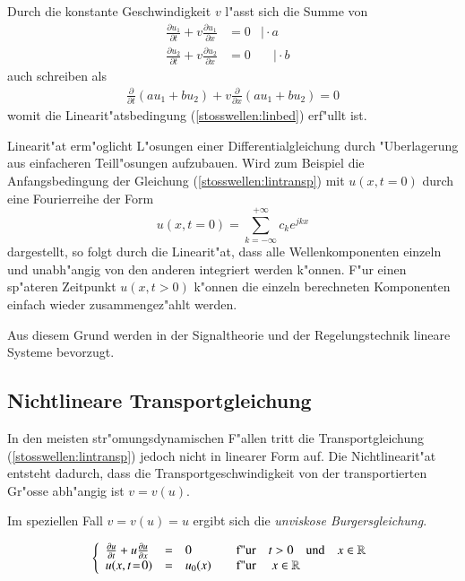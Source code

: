 \begin{refsection}
Durch die konstante Geschwindigkeit $v$ l"asst sich die Summe von
\begin{align*}
\frac{\partial u_{1}}{\partial t} + v\frac{\partial u_{1}}{\partial x}&= 0 &\bigg| \cdot a& \\
\frac{\partial u_{2}}{\partial t} + v\frac{\partial u_{2}}{\partial x}&= 0 &\quad \bigg| \cdot b&
\end{align*}
auch schreiben als
\begin{align*}
	\frac{\partial}{\partial t}(au_{1} + bu_{2}) + v\frac{\partial }{\partial x}(au_{1} + bu_{2}) = 0
\end{align*}
womit die Linearit"atsbedingung (\ref{stosswellen:linbed}) erf"ullt ist.

Linearit"at erm"oglicht L"osungen einer Differentialgleichung durch
"Uberlagerung aus einfacheren Teill"osungen aufzubauen. Wird zum Beispiel
die Anfangsbedingung der Gleichung (\ref{stosswellen:lintransp}) mit
$u(x,t\!=\!0)$ durch eine Fourierreihe der Form
\begin{equation}
	u(x,t\!=\!0) = \sum_{k=-\infty}^{+\infty} c_{k} e^{jkx}
\end{equation}
dargestellt, so folgt durch die Linearit"at, dass alle Wellenkomponenten
einzeln und unabh"angig von den anderen integriert werden k"onnen. F"ur
einen sp"ateren Zeitpunkt $u(x,t\!>\!0)$ k"onnen die einzeln berechneten
Komponenten einfach wieder zusammengez"ahlt werden.

Aus diesem Grund werden in der Signaltheorie und der Regelungstechnik
lineare Systeme bevorzugt.

\subsection{Nichtlineare Transportgleichung}

In den meisten str"omungsdynamischen F"allen tritt die Transportgleichung
(\ref{stosswellen:lintransp}) jedoch nicht in linearer Form auf. Die
Nichtlinearit"at entsteht dadurch, dass die Transportgeschwindigkeit
von der transportierten Gr"osse abh"angig ist $v=v(u)$. 

Im speziellen Fall $v\!=\!v(u)\!=\!u$ ergibt sich die \textit{unviskose
Burgersgleichung}\cite{stoss:burgersgleichung}. 

\begin{equation}
	\left\{
	\begin{array}{lcl}
	\frac{\partial u}{\partial t} + u\frac{\partial u}{\partial x} &=& 0 \hspace{1.25cm} \text{f"ur} \quad t>0 \quad \text{und} \quad x \in \mathbb{R} \\
	u(x,t\!=\!0) &= & u_{0}(x) \qquad \text{f"ur } \quad x \in \mathbb{R} 
	\end{array} \right.
	\label{stosswellen:burgeq}
\end{equation}


\end{refsection}
